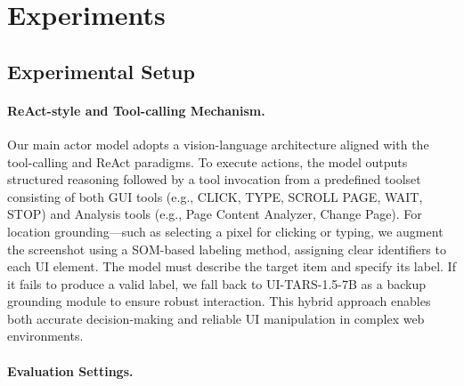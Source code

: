 \documentclass{article} %
\begin{document}







\section{Experiments}
\subsection{Experimental Setup}
\label{sec:env setup}
\paragraph{ReAct-style and Tool-calling Mechanism.} 
Our main actor model adopts a vision-language architecture aligned with the tool-calling and ReAct paradigms. To execute actions, the model outputs structured reasoning followed by a tool invocation from a predefined toolset consisting of both GUI tools (e.g., CLICK, TYPE, SCROLL PAGE, WAIT, STOP) and Analysis tools (e.g., Page Content Analyzer, Change Page). For location grounding—such as selecting a pixel for clicking or typing, we augment the screenshot using a SOM-based labeling method, assigning clear identifiers to each UI element. The model must describe the target item and specify its label. If it fails to produce a valid label, we fall back to UI-TARS-1.5-7B \citep{uitars} as a backup grounding module to ensure robust interaction. This hybrid approach enables both accurate decision-making and reliable UI manipulation in complex web environments.

\paragraph{Evaluation Settings.}
\end{document}
